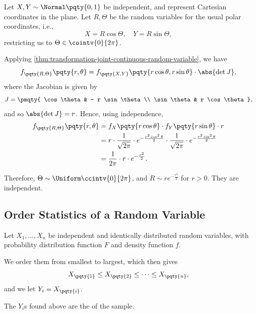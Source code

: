 \begin{example}
    \label{ex:transformation-cartesian-polar}%
    Let \(X, Y \sim \Normal\pqty{0, 1}\) be independent, and represent Cartesian coordinates in the plane. Let \(R, \Theta\) be the random variables for the usual polar coordinates, i.e.,
    \[
        X = R \cos \Theta, \quad Y = R \sin \Theta,
    \]
    restricting us to \(\Theta \in \cointv{0}{2\pi}\).

    Applying \autoref{thm:transformation-joint-continuous-random-variable}, we have
    \[
        f_{\pqty{R, \Theta}} \pqty{r, \theta} = f_{\pqty{X, Y}} \pqty{r \cos \theta, r \sin \theta} \cdot \abs{\det J},
    \]
    where the Jacobian is given by
    \[
        J = \pmqty{
            \cos \theta & - r \sin \theta \\
            \sin \theta & r \cos \theta
        },
    \]
    and so \(\abs{\det J} = r\). Hence, using independence,
    \begin{align*}
        f_{\pqty{R, \Theta}} \pqty{r, \theta} &= f_X \pqty{r \cos \theta} \cdot f_Y \pqty{r \sin \theta} \cdot r \\
        &= r \cdot \frac{1}{\sqrt{2\pi}} \cdot e^{- \frac{r^2 \cos^2 \theta}{2}} \cdot \frac{1}{\sqrt{2 \pi}} \cdot e^{- \frac{r^2 \sin^2 \theta}{2}} \\
        &= \frac{1}{2\pi} \cdot r \cdot e^{- \frac{r^2}{2}}.
    \end{align*}

    Therefore, \(\Theta \sim \Uniform\ccintv{0}{2\pi}\), and \(R \sim r e^{-\frac{r^2}{2}}\) for \(r > 0\). They are independent.
\end{example}

\subsection{Order Statistics of a Random Variable}

Let \(X_1, \ldots, X_n\) be independent and identically distributed random variables, with probability distribution function \(F\) and density function \(f\).

We order them from smallest to largest, which then gives
\[
    X_{\pqty{1}} \leq X_{\pqty{2}} \leq \cdots \leq X_{\pqty{n}},
\]
and we let \(Y_i = X_{\pqty{i}}\).

\begin{definition}
    \label{def:order-statistics}%
    The \(Y_i\)s found above are the  of the sample.
\end{definition}

